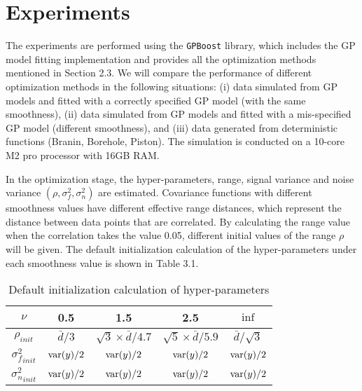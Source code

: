 \chapter{Experiments} 

The experiments are performed using the \texttt{GPBoost} library, which includes the GP model fitting implementation and provides all the optimization methods mentioned in Section 2.3. We will compare the performance of different optimization methods in the following situations: (i) data simulated from GP models and fitted with a correctly specified GP model (with the same smoothness), (ii) data simulated from GP models and fitted with a mis-specified GP model (different smoothness), and (iii) data generated from deterministic functions (Branin, Borehole, Piston). The simulation is conducted on a 10-core M2 pro processor with 16GB RAM. 

In the optimization stage, the hyper-parameters, range, signal variance and noise variance $(\rho, \sigma^2_f, \sigma^2_n)$ are estimated. Covariance functions with different smoothness values have different effective range distances, which represent the distance between data points that are correlated. By calculating the range value when the correlation takes the value 0.05, different initial values of the range $\rho$ will be given. The default initialization calculation of the hyper-parameters under each smoothness value is shown in Table 3.1.

\begin{table}[h!]
 \begin{center}
   \label{tab:table1}
   \begin{tabular}{c|c|c|c|c} %
     \hline
     $\nu$ & 0.5 & 1.5 & 2.5 & $\inf$ \\
     \hline
     \hline
     $\rho_{init}$ & $\bar{d}/3$ & $\sqrt3\times\bar{d}/4.7$ & $\sqrt5\times\bar{d}/5.9$ & $\bar{d}/\sqrt{3}$ \\
     \hline
     ${\sigma^2_f}_{init}$ & $\operatorname{var}(y)/2$ & $\operatorname{var}(y)/2$ & $\operatorname{var}(y)/2$ & $\operatorname{var}(y)/2$ \\
     \hline
     ${\sigma^2_n}_{init}$ & $\operatorname{var}(y)/2$ & $\operatorname{var}(y)/2$ & $\operatorname{var}(y)/2$ & $\operatorname{var}(y)/2$ \\
     \hline
   \end{tabular}
   \caption{Default initialization calculation of hyper-parameters}
 \end{center}
\end{table}


